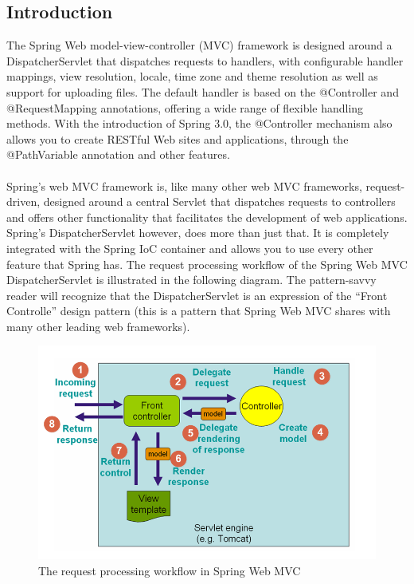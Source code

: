 \subsection{Introduction}
The Spring Web model-view-controller (MVC) framework is designed around a \colorbox{mygray}{DispatcherServlet} that dispatches requests to handlers, with configurable handler mappings, view resolution, locale, time zone and theme resolution as well as support for uploading files. The default handler is based on the \colorbox{mygray}{@Controller} and \colorbox{mygray}{@RequestMapping} annotations, offering a wide range of flexible handling methods. With the introduction of Spring 3.0, the \colorbox{mygray}{@Controller} mechanism also allows you to create RESTful Web sites and applications, through the \colorbox{mygray}{@PathVariable} annotation and other features.
 \\
\\
Spring’s web MVC framework is, like many other web MVC frameworks, request-driven, designed around a central Servlet that dispatches requests to controllers and offers other functionality that facilitates the development of web applications. Spring’s DispatcherServlet however, does more than just that. It is completely integrated with the Spring IoC container and allows you to use every other feature that Spring has.
\newpage
The request processing workflow of the Spring Web MVC DispatcherServlet is illustrated in the following diagram. The pattern-savvy reader will recognize that the DispatcherServlet is an expression of the ``Front Controlle'' design pattern (this is a pattern that Spring Web MVC shares with many other leading web frameworks).
\begin{figure}[h]
	\centering
	\includegraphics[width=1.1\textwidth]{workflow_spring_mvc.png}
	\caption{The request processing workflow in Spring Web MVC}
\end{figure}


